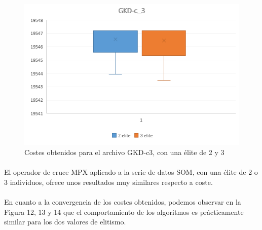 	\begin{figure}[H]
		\centering
		\includegraphics[scale=0.7]{img/MPX_2vs3/GKD-c_3_Costes}
		\caption{Costes obtenidos para el archivo GKD-c3, con una élite de 2 y 3}
		\label{gkd-c3_coste}
		
		
	\end{figure}

		\paragraph{} El operador de cruce MPX aplicado a la serie de datos SOM, con una élite de 2 o 3 individuos, ofrece unos resultados muy similares respecto a coste.
		
		\paragraph{}En cuanto a la convergencia de los costes obtenidos, podemos observar en la Figura 12, 13 y 14 que el comportamiento de los algoritmos es prácticamente similar para los dos valores de elitismo. 

